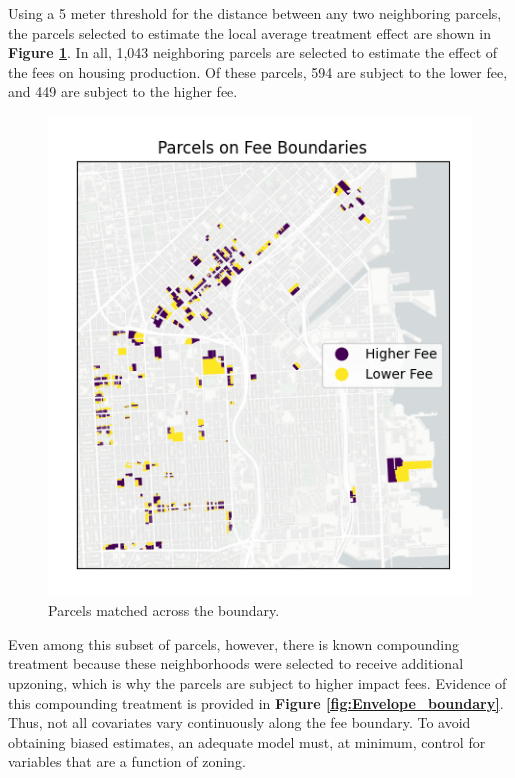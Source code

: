 \documentclass[a4paper,12pt]{article}
\begin{document}
Using a 5 meter threshold for the distance between any two neighboring parcels, the parcels selected to estimate the local average treatment effect are shown in \textbf{Figure \ref{fig:subset}}. In all, 1,043 neighboring parcels are selected to estimate the effect of the fees on housing production. Of these parcels, 594 are subject to the lower fee, and 449 are subject to the higher fee.

\begin{figure}[hbtp]
    \centering
    \includegraphics[scale=.8]{rdd/figures/eastern_fees.png}
    \caption{Parcels matched across the boundary.}
    \label{fig:subset}
\end{figure}

Even among this subset of parcels, however, there is known compounding treatment because these neighborhoods were selected to receive additional upzoning, which is why the parcels are subject to higher impact fees. Evidence of this compounding treatment is provided in \textbf{Figure \ref{fig:Envelope_boundary}}. Thus, not all covariates vary continuously along the fee boundary. To avoid obtaining biased estimates, an adequate model must, at minimum, control for variables that are a function of zoning.
\end{document}
